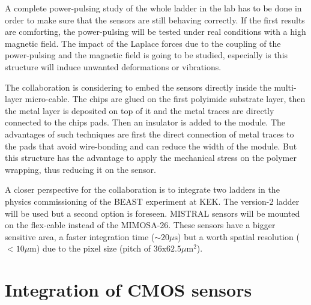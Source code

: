     A complete power-pulsing study of the whole ladder in the lab has to be done in order to make sure that the sensors are still behaving correctly.
    If the first results are comforting, the power-pulsing will be tested under real conditions with a high magnetic field.
    The impact of the Laplace forces due to the coupling of the power-pulsing and the magnetic field is going to be studied, especially is this structure will induce unwanted deformations or vibrations. 

    The collaboration is considering to embed the sensors directly inside the multi-layer micro-cable\cite{Baudot2012}.
    The chips are glued on the first polyimide substrate layer, then the metal layer is deposited on top of it and the metal traces are directly connected to the chips pads.
    Then an insulator is added to the module.
    The advantages of such techniques are first the direct connection of metal traces to the pads that avoid wire-bonding and can reduce the width of the module.
    But this structure has the advantage to apply the mechanical stress on the polymer wrapping, thus reducing it on the sensor.

    A closer perspective for the collaboration is to integrate two ladders in the physics commissioning of the BEAST experiment at KEK.
    The version-2 ladder will be used but a second option is foreseen.
    MISTRAL sensors will be mounted on the flex-cable instead of the MIMOSA-26.
    These sensors have a bigger sensitive area, a faster integration time  ($\sim 20\mu\text{s}$) but a worth spatial resolution ($< 10 \mu\text{m}$) due to the pixel size (pitch of $36 \text{x} 62.5 \mu\text{m}^2$).




  
  \section{Integration of CMOS sensors}
  \label{sec:CMOS}


